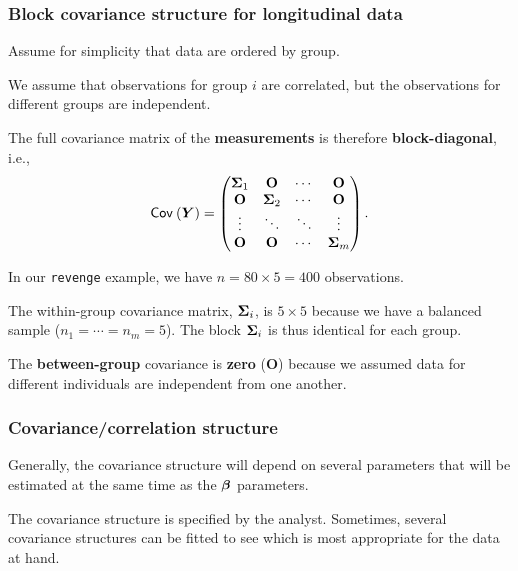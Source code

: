 \documentclass{beamer}
\begin{document}
\begin{frame}
\frametitle{Block covariance structure for longitudinal data}
\bi 
\item 
Assume for simplicity that data are ordered by group.
 \item We assume that observations for group  $i$ are correlated, but the observations for different groups are independent.
 \item 
  The full covariance matrix of the \textbf{measurements} is therefore \textbf{block-diagonal}, i.e.,
 \begin{align*}
  {\mathsf{Cov}_{}}\left(\boldsymbol {Y}\right) = \begin{pmatrix}
                 \boldsymbol {\Sigma}_1 & \mathbf{O} & \cdots & \mathbf{O}\\
                  \mathbf{O} &\boldsymbol {\Sigma}_2 & \cdots & \mathbf{O} \\
                  \vdots & \ddots & \ddots & \vdots \\
                   \mathbf{O} & \mathbf{O} & \cdots & \boldsymbol {\Sigma}_m 
                \end{pmatrix}.
\end{align*}
\bi 
\item In our \texttt{revenge} example, we have $n=80 \times 5 = 400$ observations.
\item The \alert{within-group covariance} matrix, $\boldsymbol {\Sigma}_i$, is $5 \times 5$ because we have a balanced sample ($n_1 = \cdots = n_m=5$). The block $\boldsymbol {\Sigma}_i$ is thus identical for each group.
\item The \textbf{between-group} covariance is \textbf{zero} ($\mathbf{O}$) because we assumed data for different individuals are independent from one another.
\ei
\ei
\end{frame}



\begin{frame}
\frametitle{Covariance/correlation structure}
\bi
\item Generally, the covariance structure will depend on several parameters that will be estimated at the same time as the $\boldsymbol {\beta}$ parameters. 
\item The covariance structure is specified by the analyst. Sometimes, several covariance structures can be fitted to see which is most appropriate for the data at hand. 
\ei
\end{frame}
\end{document}
